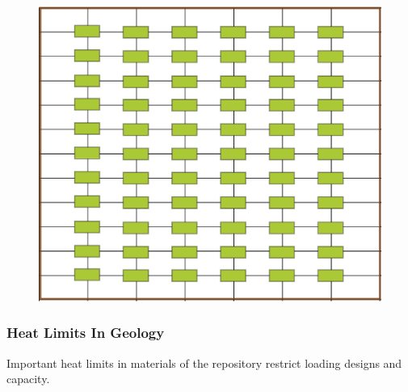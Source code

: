 \begin{frame}
  \begin{minipage}{0.3\textwidth}
    \begin{figure}[b]
      \includegraphics[width=\textwidth]{fullGrid.eps}
    \end{figure}
  \end{minipage}
\end{frame}


\begin{frame}[ctb!]
  \frametitle{Heat Limits In Geology}
  Important heat limits in materials of the repository restrict loading designs 
  and capacity.
\end{frame}

